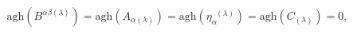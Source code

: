 \begin{equation}
\mathrm{agh}\left( B^{\alpha \beta (\lambda )}\right) =\mathrm{agh}\left(
A_{\alpha (\lambda )}\right) =\mathrm{agh}\left( \eta _{\alpha
}^{\;\;(\lambda )}\right) =\mathrm{agh}\left( C_{(\lambda )}\right) =0,
\label{cin7}
\end{equation}

